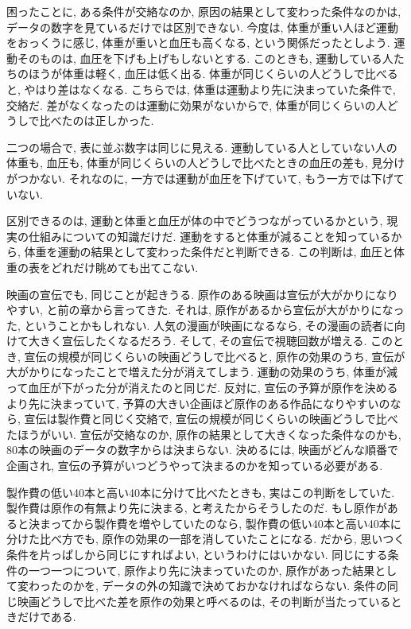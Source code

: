     困ったことに, ある条件が交絡なのか, 原因の結果として変わった条件なのかは, データの数字を見ているだけでは区別できない.
    今度は, 体重が重い人ほど運動をおっくうに感じ, 体重が重いと血圧も高くなる, という関係だったとしよう.
    運動そのものは, 血圧を下げも上げもしないとする.
    このときも, 運動している人たちのほうが体重は軽く, 血圧は低く出る.
    体重が同じくらいの人どうしで比べると, やはり差はなくなる.
    こちらでは, 体重は運動より先に決まっていた条件で, 交絡だ.
    差がなくなったのは運動に効果がないからで, 体重が同じくらいの人どうしで比べたのは正しかった.

    二つの場合で, 表に並ぶ数字は同じに見える.
    運動している人としていない人の体重も, 血圧も, 体重が同じくらいの人どうしで比べたときの血圧の差も, 見分けがつかない.
    それなのに, 一方では運動が血圧を下げていて, もう一方では下げていない.

    区別できるのは, 運動と体重と血圧が体の中でどうつながっているかという, 現実の仕組みについての知識だけだ.
    運動をすると体重が減ることを知っているから, 体重を運動の結果として変わった条件だと判断できる.
    この判断は, 血圧と体重の表をどれだけ眺めても出てこない.

    映画の宣伝でも, 同じことが起きうる.
    原作のある映画は宣伝が大がかりになりやすい, と前の章から言ってきた.
    それは, 原作があるから宣伝が大がかりになった, ということかもしれない.
    人気の漫画が映画になるなら, その漫画の読者に向けて大きく宣伝したくなるだろう.
    そして, その宣伝で視聴回数が増える.
    このとき, 宣伝の規模が同じくらいの映画どうしで比べると, 原作の効果のうち, 宣伝が大がかりになったことで増えた分が消えてしまう.
    運動の効果のうち, 体重が減って血圧が下がった分が消えたのと同じだ.
    反対に, 宣伝の予算が原作を決めるより先に決まっていて, 予算の大きい企画ほど原作のある作品になりやすいのなら, 宣伝は製作費と同じく交絡で, 宣伝の規模が同じくらいの映画どうしで比べたほうがいい.
    宣伝が交絡なのか, 原作の結果として大きくなった条件なのかも, 80本の映画のデータの数字からは決まらない.
    決めるには, 映画がどんな順番で企画され, 宣伝の予算がいつどうやって決まるのかを知っている必要がある.

    製作費の低い40本と高い40本に分けて比べたときも, 実はこの判断をしていた.
    製作費は原作の有無より先に決まる, と考えたからそうしたのだ.
    もし原作があると決まってから製作費を増やしていたのなら, 製作費の低い40本と高い40本に分けた比べ方でも, 原作の効果の一部を消していたことになる.
    だから, 思いつく条件を片っぱしから同じにすればよい, というわけにはいかない.
    同じにする条件の一つ一つについて, 原作より先に決まっていたのか, 原作があった結果として変わったのかを, データの外の知識で決めておかなければならない.
    条件の同じ映画どうしで比べた差を原作の効果と呼べるのは, その判断が当たっているときだけである.

